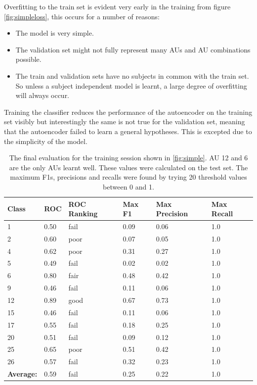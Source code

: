     Overfitting to the train set is evident very
    early in the training from figure \ref{fig:simpleloss},
    this occurs for a number of reasons:
    \begin{itemize}
      \item The model is very simple.
      \item The validation set might not fully represent many AUs and AU combinations possible.
      \item The train and validation sets have no subjects in common with the train set.
            So unless a subject independent model is learnt, a large degree of overfitting will always occur.
    \end{itemize}

    Training the classifier reduces the performance of the autoencoder on the
    training set visibly but interestingly the same is not true for the validation set, meaning
    that the autoencoder failed to learn a general hypotheses. This is
    excepted due to the simplicity of the model.

    \begin{table}[!h]
    \centering
    {\small
    \begin{tabular}{llllll}
    \hline
    \textbf{Class}    & \textbf{ROC} & \textbf{ROC Ranking} & \textbf{Max F1} & \textbf{Max Precision} & \textbf{Max Recall} \\ \hline
    1                 & 0.50  & fail  & 0.09  & 0.06    & 1.0      \\
    2                 & 0.60  & poor  & 0.07  & 0.05    & 1.0      \\
    4                 & 0.62  & poor  & 0.31  & 0.27    & 1.0      \\
    5                 & 0.49  & fail  & 0.02  & 0.02    & 1.0      \\
    6                 & 0.80  & fair  & 0.48  & 0.42    & 1.0      \\
    9                 & 0.46  & fail  & 0.11  & 0.06    & 1.0      \\
    12                & 0.89  & good  & 0.67  & 0.73    & 1.0      \\
    15                & 0.46  & fail  & 0.11  & 0.06    & 1.0      \\
    17                & 0.55  & fail  & 0.18  & 0.25    & 1.0      \\
    20                & 0.51  & fail  & 0.09  & 0.12    & 1.0      \\
    25                & 0.65  & poor  & 0.51  & 0.42    & 1.0      \\
    26                & 0.57  & fail  & 0.32  & 0.23    & 1.0      \\ \hline
    \textbf{Average:} & 0.59  & fail  & 0.25  & 0.22    & 1.0      \\ \hline
    \end{tabular} }
    \caption{The final evaluation for the training session shown in \ref{fig:simple}.
    AU 12 and 6 are the only AUs learnt well. These values were
    calculated on the test set. The maximum F1s, precisions and recalls
    were found by trying 20 threshold values between 0 and 1.}
    \label{tab:biglist}
    \end{table}

